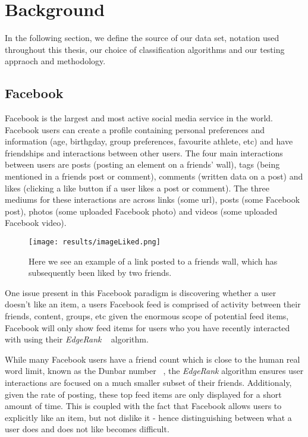 
\chapter{Background}
\label{cha:back}

In the following section, we define the source of our data set, notation used throughout this thesis, our choice of classification algorithms and 
our testing appraoch and methodology.

\section{Facebook}
\label{sec:data}

Facebook is the largest and most active social media service in the world. Facebook users can create a profile containing personal 
preferences and information (age, birthgday, group preferences, favourite athlete, etc) and have friendships and interactions 
between other users. The four main interactions between users are posts (posting an element on a friends' wall), tags
(being mentioned in a friends post or comment), comments (written data on a post) and likes (clicking a like button if a user 
likes a post or comment). The three mediums for these interactions are across links (some url), posts (some Facebook post), 
photos (some uploaded Facebook photo) and videos (some uploaded Facebook video).

\begin{figure}[h]
	\begin{center}
		\texttt{[image: results/imageLiked.png]}
		\caption{Here we see an example of a link posted to a friends wall, which has subsequently been liked by two friends.}
	\end{center}
\end{figure}

\clearpage
One issue present in this Facebook paradigm is discovering whether a user doesn't like an item, a users Facebook feed is comprised of 
activity between their friends, content, groups, etc given the enormous scope of potential feed items, Facebook will only show feed 
items for users who you have recently interacted with using their \emph{EdgeRank} ~\cite{edge} algorithm. 

While many Facebook users have a friend count which is close to the human real word limit, known as the Dunbar number 
~\cite{hill2003social}, the \emph{EdgeRank} algorithm ensures user interactions are focused on a much smaller subset of their friends.
Additionaly, given the rate of posting, these top feed items are only displayed for a short amount of time. This is coupled 
with the fact that Facebook allows users to explicitly like an item, but not dislike it - hence distinguishing between what 
a user does and does not like becomes difficult.

